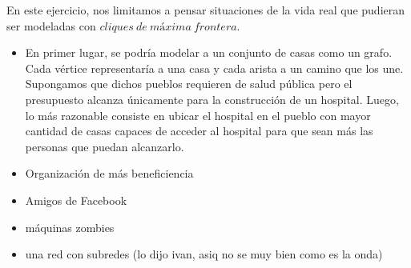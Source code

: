 En este ejercicio, nos limitamos a pensar situaciones de la vida real que pudieran ser modeladas con $cliques\ de\ máxima\ frontera$.
\begin{itemize}
\item En primer lugar, se podría modelar a un conjunto de casas como un grafo. Cada vértice representaría a una casa y cada arista a un camino que los une. Supongamos que dichos pueblos requieren de salud pública pero el presupuesto alcanza únicamente para la construcción de un hospital. Luego, lo más razonable consiste en ubicar el hospital en el pueblo con mayor cantidad de casas capaces de acceder al hospital para que sean más las personas que puedan alcanzarlo.

\item Organización de más beneficiencia

\item Amigos de Facebook

\item máquinas zombies 

\item una red con subredes (lo dijo ivan, asiq no se muy bien como es la onda)
 
\end{itemize}

